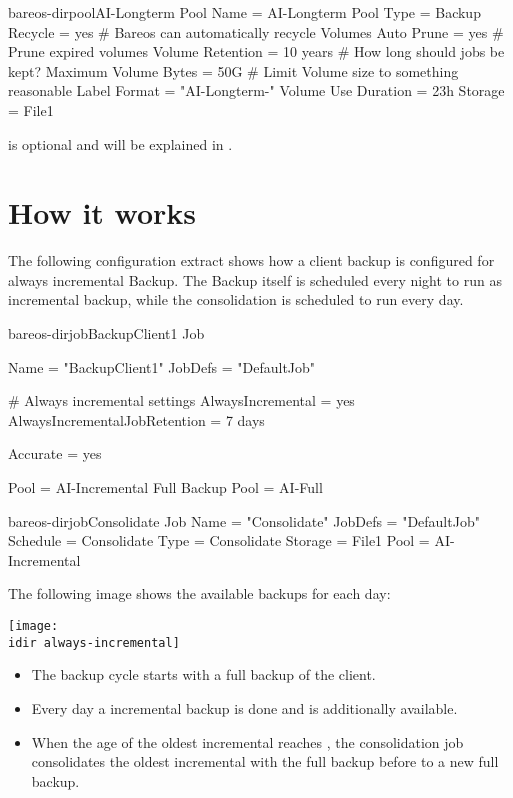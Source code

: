 \begin{bareosConfigResource}{bareos-dir}{pool}{AI-Longterm}
Pool {
  Name = AI-Longterm
  Pool Type = Backup
  Recycle = yes                       # Bareos can automatically recycle Volumes
  Auto Prune = yes                    # Prune expired volumes
  Volume Retention = 10 years         # How long should jobs be kept?
  Maximum Volume Bytes = 50G          # Limit Volume size to something reasonable
  Label Format = "AI-Longterm-"
  Volume Use Duration = 23h
  Storage = File1
}
\end{bareosConfigResource}

 is optional and will be explained in .

\section{How it works}

The following configuration extract shows how a client backup is configured for always incremental Backup.
The Backup itself is scheduled every night to run as incremental backup, while the consolidation is scheduled to run every day.

\begin{bareosConfigResource}{bareos-dir}{job}{BackupClient1}
Job {
  Name = "BackupClient1"
  JobDefs = "DefaultJob"

  # Always incremental settings
  AlwaysIncremental = yes
  AlwaysIncrementalJobRetention = 7 days

  Accurate = yes

  Pool = AI-Incremental
  Full Backup Pool = AI-Full
}
\end{bareosConfigResource}

\begin{bareosConfigResource}{bareos-dir}{job}{Consolidate}
Job {
  Name = "Consolidate"
  JobDefs = "DefaultJob"
  Schedule = Consolidate
  Type = Consolidate
  Storage = File1
  Pool = AI-Incremental
}
\end{bareosConfigResource}



The following image shows the available backups for each day:

\begin{center}
\texttt{[image: \\idir always-incremental]}
\end{center}


\begin{itemize}
    \item The backup cycle starts with a full backup of the client. 
    \item Every day a incremental backup is done and is additionally available.
    \item When the age of the oldest incremental reaches , the consolidation job consolidates the oldest incremental with the full backup before to a new full backup.
\end{itemize}


